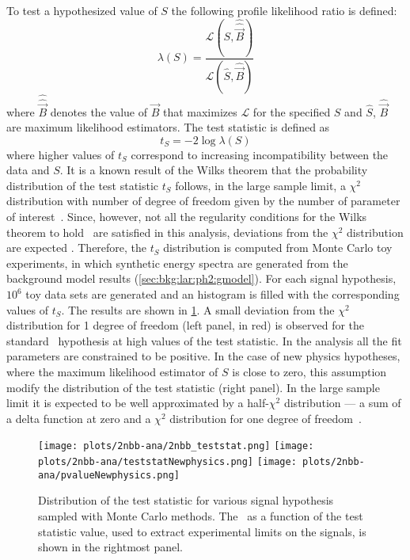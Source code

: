 To test a hypothesized value of $S$ the following profile likelihood ratio is defined:
\[
  \lambda(S) = \frac{\mathcal{L}(S, \hat{\hat{\vec{B}}})}{\mathcal{L}(\hat{S}, \hat{\vec{B}})}
\]
where $\hat{\hat{\vec{B}}}$ denotes the value of $\vec{B}$ that maximizes $\mathcal{L}$
for the specified $S$ and $\hat{S}$, $\hat{\vec{B}}$ are maximum likelihood
estimators. The test statistic is defined as
\[
  t_S = -2\log\lambda(S)
\]
where higher values of $t_S$ correspond to increasing incompatibility between the data and
$S$. It is a known result of the Wilks theorem that the probability distribution of the
test statistic $t_S$ follows, in the large sample limit, a $\chi^2$ distribution with
number of degree of freedom given by the number of parameter of interest~\cite{Cowan2011}.
Since, however, not all the regularity conditions for the Wilks theorem to
hold~\cite{Algeri2020} are satisfied in this analysis, deviations from the $\chi^2$
distribution are expected . Therefore, the $t_S$ distribution is computed
from Monte Carlo toy experiments, in which synthetic energy spectra are generated from the
background model results (\cref{sec:bkg:lar:ph2:gmodel}). For each signal hypothesis,
$10^6$ toy data sets are generated and an histogram is filled with the corresponding
values of $t_S$. The results are shown in \cref{fig:2nbb-ana:ts-dist}. A small deviation
from the $\chi^2$ distribution for 1 degree of freedom (left panel, in red) is observed
for the standard \nnbb\ hypothesis at high values of the test statistic. In the analysis
all the fit parameters are constrained to be positive. In the case of new physics
hypotheses, where the maximum likelihood estimator of $S$ is close to zero, this
assumption modify the distribution of the test statistic (right panel). In the large
sample limit it is expected to be well approximated by a half-$\chi^2$ distribution --- a
sum of a delta function at zero and a $\chi^2$ distribution for one degree of
freedom~\cite{Cowan2011}.

\begin{figure}
  \centering
  \texttt{[image: plots/2nbb-ana/2nbb\_teststat.png]}%
  \texttt{[image: plots/2nbb-ana/teststatNewphysics.png]}%
  \texttt{[image: plots/2nbb-ana/pvalueNewphysics.png]}
  \caption{%
    Distribution of the test statistic for various signal hypothesis sampled with Monte
    Carlo methods. The \pvalue\ as a function of the test statistic value, used to extract
    experimental limits on the signals, is shown in the rightmost panel. 
  }\label{fig:2nbb-ana:ts-dist}
\end{figure}

